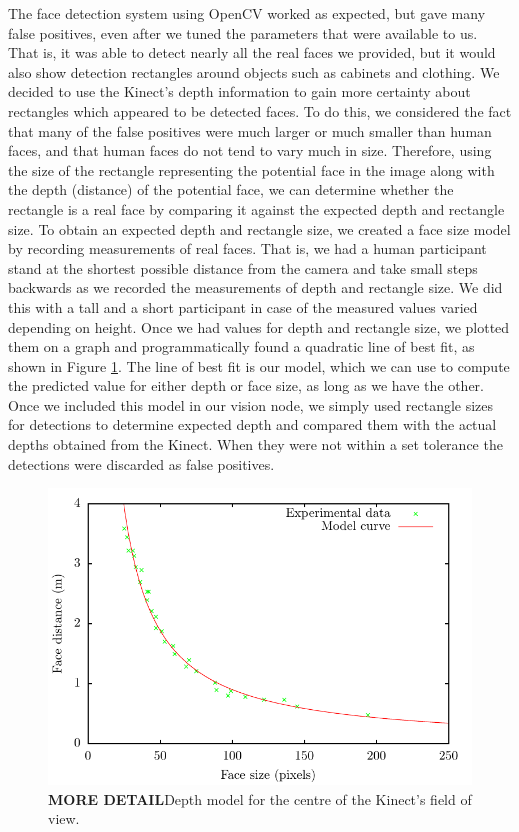 \documentclass[conference]{IEEEtran}
\begin{document}
The face detection system using OpenCV worked as expected, but gave many false positives, even after we tuned the parameters that were available to us. That is, it was able to detect nearly all the real faces we provided, but it would also show detection rectangles around objects such as cabinets and clothing. We decided to use the Kinect's depth information to gain more certainty about rectangles which appeared to be detected faces. To do this, we considered the fact that many of the false positives were much larger or much smaller than human faces, and that human faces do not tend to vary much in size. Therefore, using the size of the rectangle representing the potential face in the image along with the depth (distance) of the potential face, we can determine whether the rectangle is a real face by comparing it against the expected depth and rectangle size. To obtain an expected depth and rectangle size, we created a face size model by recording measurements of real faces. That is, we had a human participant stand at the shortest possible distance from the camera and take small steps backwards as we recorded the measurements of depth and rectangle size. We did this with a tall and a short participant in case of the measured values varied depending on height. Once we had values for depth and rectangle size, we plotted them on a graph and programmatically found a quadratic line of best fit, as shown in Figure \ref{fig:model}. The line of best fit is our model, which we can use to compute the predicted value for either depth or face size, as long as we have the other. Once we included this model in our vision node, we simply used rectangle sizes for detections to determine expected depth and compared them with the actual depths obtained from the Kinect. When they were not within a set tolerance the detections were discarded as false positives.

\begin{figure}
  \includegraphics[width=\columnwidth]{centre_model}
  \caption{\textbf{MORE DETAIL}Depth model for the centre of the Kinect's field of view.}
  \label{fig:model}
\end{figure}
\end{document}
